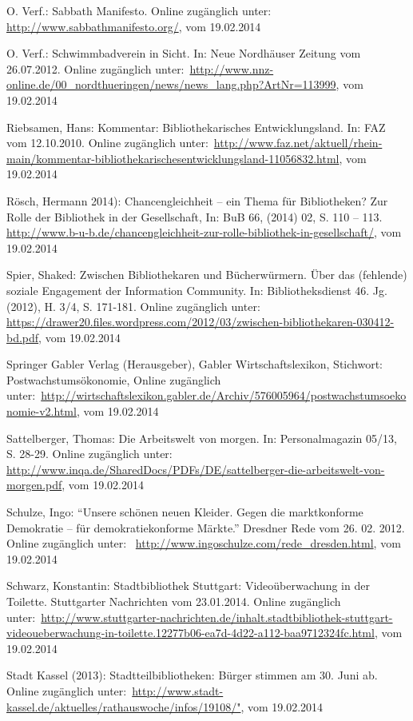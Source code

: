 \documentclass[a4paper,
fontsize=11pt,
oneside,
numbers=noperiodatend,
parskip=half-,
bibliography=totoc,
final
]{scrartcl}
\begin{document}
O. Verf.: Sabbath Manifesto. Online zugänglich unter:~
\url{http://www.sabbathmanifesto.org/}, vom 19.02.2014

O. Verf.: Schwimmbadverein in Sicht. In: Neue Nordhäuser Zeitung vom
26.07.2012. Online zugänglich
unter:~\url{http://www.nnz-online.de/00\_nordthueringen/news/news_lang.php?ArtNr=113999},
vom 19.02.2014

Riebsamen, Hans: Kommentar: Bibliothekarisches Entwicklungsland. In: FAZ
vom 12.10.2010. Online zugänglich
unter:~\url{http://www.faz.net/aktuell/rhein-main/kommentar-bibliothekarischesentwicklungsland-11056832.html},
vom 19.02.2014

Rösch, Hermann 2014): Chancengleichheit -- ein Thema für Bibliotheken?
Zur Rolle der Bibliothek in der Gesellschaft, In: BuB 66, (2014) 02, S.
110 -- 113.
\url{http://www.b-u-b.de/chancengleichheit-zur-rolle-bibliothek-in-gesellschaft/},
vom 19.02.2014

Spier, Shaked: Zwischen Bibliothekaren und Bücherwürmern. Über das
(fehlende) soziale Engagement der Information Community. In:
Bibliotheksdienst 46. Jg. (2012), H. 3/4, S. 171-181. Online zugänglich
unter:~
\url{https://drawer20.files.wordpress.com/2012/03/zwischen-bibliothekaren-030412-bd.pdf},
vom 19.02.2014

Springer Gabler Verlag (Herausgeber), Gabler Wirtschaftslexikon,
Stichwort: Postwachstumsökonomie, Online zugänglich
unter:~\url{http://wirtschaftslexikon.gabler.de/Archiv/576005964/postwachstumsoekonomie-v2.html},
vom 19.02.2014

Sattelberger, Thomas: Die Arbeitswelt von morgen. In: Personalmagazin
05/13, S. 28-29. Online zugänglich unter:~
\url{http://www.inqa.de/SharedDocs/PDFs/DE/sattelberger-die-arbeitswelt-von-morgen.pdf},
vom 19.02.2014

Schulze, Ingo: \enquote{Unsere schönen neuen Kleider. Gegen die
marktkonforme Demokratie -- für demokratiekonforme Märkte.} Dresdner
Rede vom 26. 02. 2012. Online zugänglich unter:~
\url{http://www.ingoschulze.com/rede_dresden.html}, vom 19.02.2014

Schwarz, Konstantin: Stadtbibliothek Stuttgart: Videoüberwachung in der
Toilette. Stuttgarter Nachrichten vom 23.01.2014. Online zugänglich
unter:~\url{http://www.stuttgarter-nachrichten.de/inhalt.stadtbibliothek-stuttgart-videoueberwachung-in-toilette.12277b06-ea7d-4d22-a112-baa9712324fc.html},
vom 19.02.2014

Stadt Kassel (2013): Stadtteilbibliotheken: Bürger stimmen am 30. Juni
ab. Online zugänglich
unter:~\url{http://www.stadt-kassel.de/aktuelles/rathauswoche/infos/19108/"},
vom 19.02.2014
\end{document}
